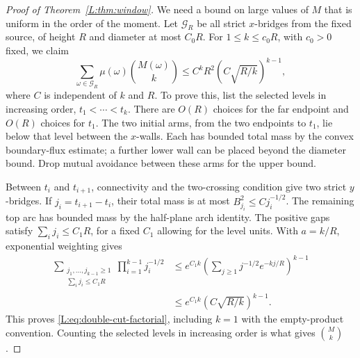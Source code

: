 \begin{proof}[Proof of Theorem~\ref{L:thm:window}]
We need a bound on large values of $M$ that is uniform in the order of
the moment. Let $\mathcal G_R$ be all strict $x$-bridges from the fixed
source, of height $R$ and diameter at most $C_0R$. For
$1\le k\le c_0R$, with $c_0>0$ fixed, we claim
\begin{equation}
 \sum_{\omega\in\mathcal G_R}\mu(\omega)
       \binom{M(\omega)}{k}
 \le C^kR^2\left(C\sqrt{R/k}\right)^{k-1},
 \label{L:eq:double-cut-factorial}
\end{equation}
where $C$ is independent of $k$ and $R$.
To prove this, list the selected levels in increasing order,
$t_1<\cdots<t_k$. There are $O(R)$ choices for the far endpoint and
$O(R)$ choices for $t_1$. The two initial arms, from the two endpoints
to $t_1$, lie below that level between the $x$-walls. Each has bounded
total mass by the convex boundary-flux estimate; a further lower wall
can be placed beyond the diameter bound. Drop mutual avoidance between
these arms for the upper bound.

Between $t_i$ and $t_{i+1}$, connectivity and the two-crossing condition
give two strict $y$-bridges. If $j_i=t_{i+1}-t_i$, their total mass is
at most $B_{j_i}^2\le Cj_i^{-1/2}$. The remaining top arc has bounded
mass by the half-plane arch identity. The positive gaps satisfy
$\sum_i j_i\le C_1R$, for a fixed $C_1$ allowing for the level units.
With $a=k/R$, exponential weighting gives
\[
 \begin{aligned}
 \sum_{\substack{j_1,\ldots,j_{k-1}\ge1\\
                  \sum_i j_i\le C_1R}}
       \prod_{i=1}^{k-1}j_i^{-1/2}
 &\le e^{C_1k}
       \left(\sum_{j\ge1}j^{-1/2}e^{-kj/R}\right)^{k-1}\\
 &\le e^{C_1k}\left(C\sqrt{R/k}\right)^{k-1}.
 \end{aligned}
\]
This proves \eqref{L:eq:double-cut-factorial}, including $k=1$ with
the empty-product convention. Counting the selected levels in
increasing order is what gives $\binom Mk$.


\end{proof}
